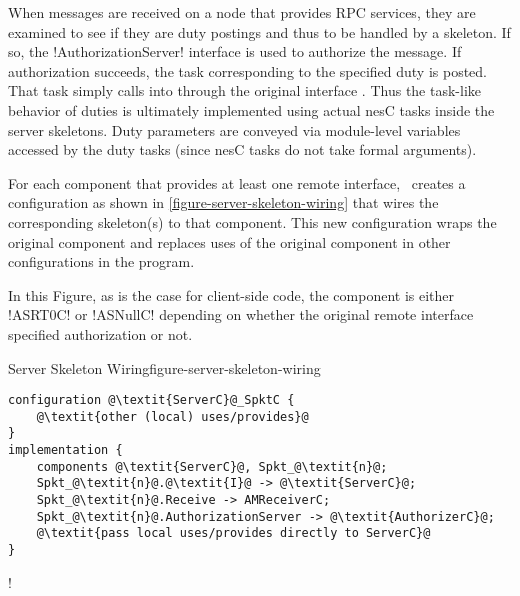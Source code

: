When messages are received on a node that provides RPC services, they are examined to see if
they are duty postings and thus to be handled by a skeleton. If so, the !AuthorizationServer!
interface is used to authorize the message. If authorization succeeds, the task corresponding to
the specified duty is posted. That task simply calls into  through the
original interface . Thus the task-like behavior of duties is ultimately
implemented using actual nesC tasks inside the server skeletons. Duty parameters are conveyed
via module-level variables accessed by the duty tasks (since nesC tasks do not take formal
arguments).

For each component that provides at least one remote interface, \Sprocket\ creates a
configuration as shown in \autoref{figure-server-skeleton-wiring} that wires the corresponding
skeleton(s) to that component. This new configuration wraps the original component and replaces
uses of the original component in other configurations in the program.

In this Figure, as is the case for client-side code, the  component
is either !ASRT0C! or !ASNullC! depending on whether the original remote interface specified
authorization or not.


\begin{fpfig}[t]{Server Skeleton Wiring}{figure-server-skeleton-wiring}
{
\singlespace
\begin{lstlisting}[escapechar=@]
configuration @\textit{ServerC}@_SpktC {
    @\textit{other (local) uses/provides}@
}
implementation {
    components @\textit{ServerC}@, Spkt_@\textit{n}@;
    Spkt_@\textit{n}@.@\textit{I}@ -> @\textit{ServerC}@;
    Spkt_@\textit{n}@.Receive -> AMReceiverC;
    Spkt_@\textit{n}@.AuthorizationServer -> @\textit{AuthorizerC}@;
    @\textit{pass local uses/provides directly to ServerC}@
}
\end{lstlisting}
\primaryspacing
}
\end{fpfig}

\lstDeleteShortInline!

